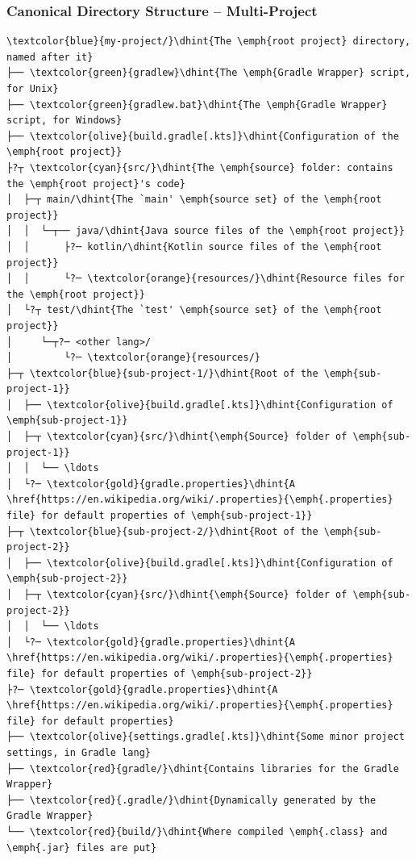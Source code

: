 \documentclass[presentation]{beamer}\mode<presentation>{\usetheme{AMSBolognaFC}}
\begin{document}
\begin{frame}[fragile]
    \frametitle{Canonical Directory Structure -- Multi-Project}

\begin{Verbatim}[fontsize=\tiny,commandchars=\\\{\}]
\textcolor{blue}{my-project/}\dhint{The \emph{root project} directory, named after it}
├── \textcolor{green}{gradlew}\dhint{The \emph{Gradle Wrapper} script, for Unix}
├── \textcolor{green}{gradlew.bat}\dhint{The \emph{Gradle Wrapper} script, for Windows}
├── \textcolor{olive}{build.gradle[.kts]}\dhint{Configuration of the \emph{root project}}
├?┬ \textcolor{cyan}{src/}\dhint{The \emph{source} folder: contains the \emph{root project}'s code}
│  ├─┬ main/\dhint{The `main' \emph{source set} of the \emph{root project}}
│  │  └─┬── java/\dhint{Java source files of the \emph{root project}}
│  │      ├?─ kotlin/\dhint{Kotlin source files of the \emph{root project}}
│  │      └?─ \textcolor{orange}{resources/}\dhint{Resource files for the \emph{root project}}
│  └?┬ test/\dhint{The `test' \emph{source set} of the \emph{root project}}
│     └─┬?─ <other lang>/
│         └?─ \textcolor{orange}{resources/}
├─┬ \textcolor{blue}{sub-project-1/}\dhint{Root of the \emph{sub-project-1}}
│  ├── \textcolor{olive}{build.gradle[.kts]}\dhint{Configuration of \emph{sub-project-1}}
│  ├─┬ \textcolor{cyan}{src/}\dhint{\emph{Source} folder of \emph{sub-project-1}}
│  │  └── \ldots
│  └?─ \textcolor{gold}{gradle.properties}\dhint{A \href{https://en.wikipedia.org/wiki/.properties}{\emph{.properties} file} for default properties of \emph{sub-project-1}}
├─┬ \textcolor{blue}{sub-project-2/}\dhint{Root of the \emph{sub-project-2}}
│  ├── \textcolor{olive}{build.gradle[.kts]}\dhint{Configuration of \emph{sub-project-2}}
│  ├─┬ \textcolor{cyan}{src/}\dhint{\emph{Source} folder of \emph{sub-project-2}}
│  │  └── \ldots
│  └?─ \textcolor{gold}{gradle.properties}\dhint{A \href{https://en.wikipedia.org/wiki/.properties}{\emph{.properties} file} for default properties of \emph{sub-project-2}}
├?─ \textcolor{gold}{gradle.properties}\dhint{A \href{https://en.wikipedia.org/wiki/.properties}{\emph{.properties} file} for default properties}
├── \textcolor{olive}{settings.gradle[.kts]}\dhint{Some minor project settings, in Gradle lang}
├── \textcolor{red}{gradle/}\dhint{Contains libraries for the Gradle Wrapper}
├── \textcolor{red}{.gradle/}\dhint{Dynamically generated by the Gradle Wrapper}
└── \textcolor{red}{build/}\dhint{Where compiled \emph{.class} and \emph{.jar} files are put}
\end{Verbatim}
\end{frame}
\end{document}
